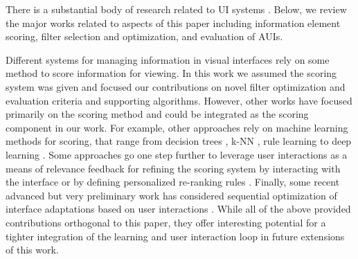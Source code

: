 

There is a substantial body of research related to UI systems \cite{Dumais2016,Seiji2001,Inibhunu2016}. %
Below, we review the major works related to aspects of this paper including information element scoring, filter selection and optimization, and evaluation of AUIs.


 Different systems for managing information in visual interfaces rely on some method to score information for viewing.  In this work we assumed the scoring system was given and focused our contributions on novel filter optimization and evaluation criteria and supporting algorithms.  However, other works have focused primarily on the scoring method and could be integrated as the scoring component in our work.  For example, other approaches rely on machine learning methods for scoring, that range from decision trees \cite{Cui2008b}, k-NN \cite{Amershi2011}, rule learning \cite{Mezhoudi2013} to deep learning \cite{Harold2017}.  
Some approaches go one step further to leverage user interactions as a means of relevance feedback for refining the scoring system by interacting with the interface \cite{Harold2017,Schrier2008}  or by defining personalized re-ranking rules 
\cite{Fogarty2008}.
Finally, some recent advanced but very preliminary work has considered sequential optimization of interface adaptations based on user interactions \cite{Harold2017}.  While all of the above provided contributions orthogonal to this paper, they offer interesting potential for a tighter integration of the learning and user interaction loop in future extensions of this work.


